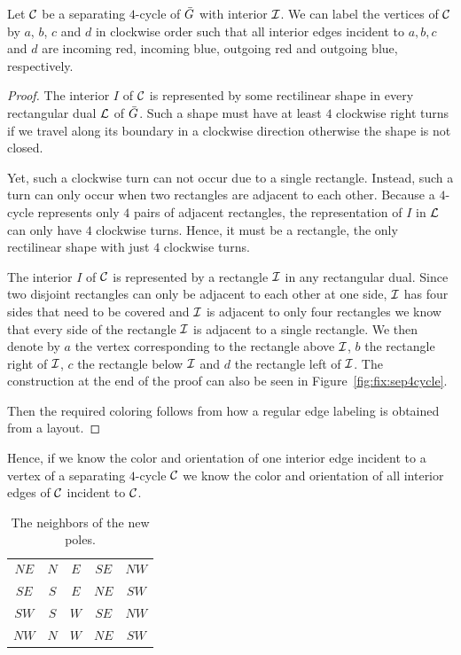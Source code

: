   \begin{lemma}
    \label{lm:fix:fourCycleInteriorColor}
    Let $\mathcal{C}$ be a separating $4$-cycle of $\bar{G}$ with interior $\mathcal{I}$. We can label the vertices of $\mathcal{C}$ by $a$, $b$, $c$ and $d$ in clockwise order such that all interior edges incident to $a, b, c$ and $d$ are incoming red, incoming blue, outgoing red and outgoing blue, respectively.
  \end{lemma}
  \begin{proof}
    The interior $I$ of $\mathcal{C}$ is represented by some rectilinear shape in every rectangular dual $\mathcal{L}$ of $\bar{G}$. Such a shape must have at least $4$ clockwise right turns if we travel along its boundary in a clockwise direction otherwise the shape is not closed.

    Yet, such a clockwise turn can not occur due to a single rectangle. Instead, such a turn can only occur when two rectangles are adjacent to each other. Because a $4$-cycle represents only $4$ pairs of adjacent rectangles, the representation of $I$ in $\mathcal{L}$ can only have $4$ clockwise turns. Hence, it must be a rectangle, the only rectilinear shape with just $4$ clockwise turns.

    The interior $I$ of $\mathcal{C}$ is represented by a rectangle $\mathcal{I}$ in any rectangular dual. Since two disjoint rectangles can only be adjacent to each other at one side, $\mathcal{I}$ has four sides that need to be covered and $\mathcal{I}$ is adjacent to only four rectangles we know that every side of the rectangle $\mathcal{I}$ is adjacent to a single rectangle. We then denote by $a$ the vertex corresponding to the rectangle above $\mathcal{I}$, $b$ the rectangle right of $\mathcal{I}$, $c$ the rectangle below $\mathcal{I}$ and $d$ the rectangle left of $\mathcal{I}$.
    The construction at the end of the proof can also be seen in Figure~\ref{fig:fix:sep4cycle}.

    Then the required coloring follows from how a regular edge labeling is obtained from a layout.
  \end{proof}

  Hence, if we know the color and orientation of one interior edge incident to a vertex of a separating $4$-cycle $\mathcal{C}$ we know the color and orientation of all interior edges of $\mathcal{C}$ incident to $\mathcal{C}$.

    \begin{table}
      \centering
      \begin{tabular}{c|| c c c c}
        $NE$ & $N$ & $ E$ & $ SE$ & $ NW$ \\
        $SE$ & $S$ & $ E$ & $ NE$ & $ SW$\\
        $SW$ & $S$ & $ W$ & $ SE$ & $ NW$\\
        $NW$ & $N$ & $ W$ & $ NE$ & $ SW$\\
      \end{tabular}
      \caption{The neighbors of the new poles.}
      \label{tab:scaffold}
    \end{table}

